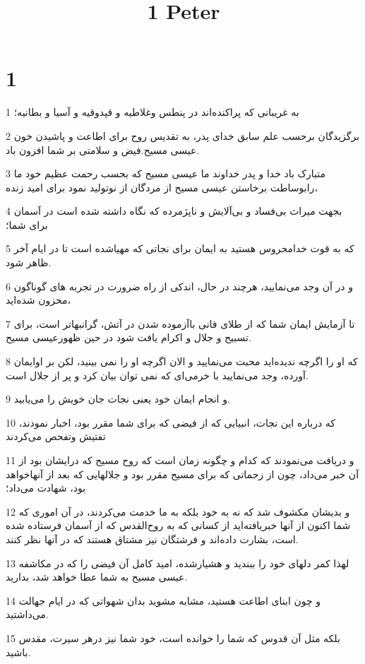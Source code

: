 

\title{1 Peter}


\chapter{1}

\par 1 به غریبانی که پراکنده‌اند در پنطس وغلاطیه و قپدوقیه و آسیا و بطانیه؛
\par 2 برگزیدگان برحسب علم سابق خدای پدر، به تقدیس روح برای اطاعت و پاشیدن خون عیسی مسیح.فیض و سلامتی بر شما افزون باد.
\par 3 متبارک باد خدا و پدر خداوند ما عیسی مسیح که بحسب رحمت عظیم خود ما رابوساطت برخاستن عیسی مسیح از مردگان از نوتولید نمود برای امید زنده،
\par 4 بجهت میراث بی‌فساد و بی‌آلایش و ناپژمرده که نگاه داشته شده است در آسمان برای شما؛
\par 5 که به قوت خدامحروس هستید به ایمان برای نجاتی که مهیاشده است تا در ایام آخر ظاهر شود.
\par 6 و در آن وجد می‌نمایید، هرچند در حال، اندکی از راه ضرورت در تجربه های گوناگون محزون شده‌اید،
\par 7 تا آزمایش ایمان شما که از طلای فانی باآزموده شدن در آتش، گرانبهاتر است، برای تسبیح و جلال و اکرام یافت شود در حین ظهورعیسی مسیح.
\par 8 که او را اگرچه ندیده‌اید محبت می‌نمایید و الان اگرچه او را نمی بینید، لکن بر اوایمان آورده، وجد می‌نمایید با خرمی‌ای که نمی توان بیان کرد و پر از جلال است.
\par 9 و انجام ایمان خود یعنی نجات جان خویش را می‌یابید.
\par 10 که درباره این نجات، انبیایی که از فیضی که برای شما مقرر بود، اخبار نمودند، تفتیش وتفحص می‌کردند
\par 11 و دریافت می‌نمودند که کدام و چگونه زمان است که روح مسیح که درایشان بود از آن خبر می‌داد، چون از زحماتی که برای مسیح مقرر بود و جلالهایی که بعد از آنهاخواهد بود، شهادت می‌داد؛
\par 12 و بدیشان مکشوف شد که نه به خود بلکه به ما خدمت می‌کردند، در آن اموری که شما اکنون از آنها خبریافته‌اید از کسانی که به روح‌القدس که از آسمان فرستاده شده است، بشارت داده‌اند و فرشتگان نیز مشتاق هستند که در آنها نظر کنند.
\par 13 لهذا کمر دلهای خود را ببندید و هشیارشده، امید کامل آن فیضی را که در مکاشفه عیسی مسیح به شما عطا خواهد شد، بدارید.
\par 14 و چون ابنای اطاعت هستید، مشابه مشوید بدان شهواتی که در ایام جهالت می‌داشتید.
\par 15 بلکه مثل آن قدوس که شما را خوانده است، خود شما نیز درهر سیرت، مقدس باشید.
